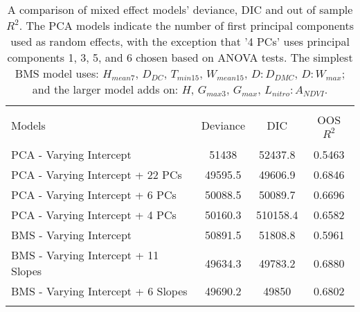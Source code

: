 \begin{table*}[!htbp] \centering 
\begin{tabular}{@{\extracolsep{5pt}}lccc} 
\hline \\[-1.8ex] 
Models & \multicolumn{1}{c}{Deviance} & \multicolumn{1}{c}{DIC} & \multicolumn{1}{c}{OOS $R^{2}$} \\
    \hline \\[-1.8ex]
PCA - Varying Intercept & 51438 & 52437.8 & 0.5463 \\
PCA - Varying Intercept + 22 PCs & 49595.5 & 49606.9 & 0.6846 \\
PCA - Varying Intercept + 6 PCs & 50088.5 & 50089.7 & 0.6696 \\
PCA - Varying Intercept + 4 PCs & 50160.3 & 510158.4 & 0.6582 \\
BMS - Varying Intercept & 50891.5 & 51808.8 & 0.5961 \\
BMS - Varying Intercept + 11 Slopes & 49634.3 & 49783.2 & 0.6880 \\
BMS - Varying Intercept + 6 Slopes & 49690.2 & 49850 & 0.6802 \\
\hline \\[-1.8ex] 
\end{tabular} 
\caption{A comparison of mixed effect models' deviance, DIC and out of sample $R^{2}$. The PCA models indicate the number of first principal components used as random effects, with the exception that '4 PCs' uses principal components 1, 3, 5, and 6 chosen based on ANOVA tests. The simplest BMS model uses: $H_{mean7}$, $D_{DC}$, $T_{min15}$, $W_{mean15}$, $D:D_{DMC}$, $D:W_{max}$; and the larger model adds on: $H$, $G_{max3}$, $G_{max}$, $L_{nitro}:A_{NDVI}$.}
\label{tab:DIC} 
\end{table*} 
